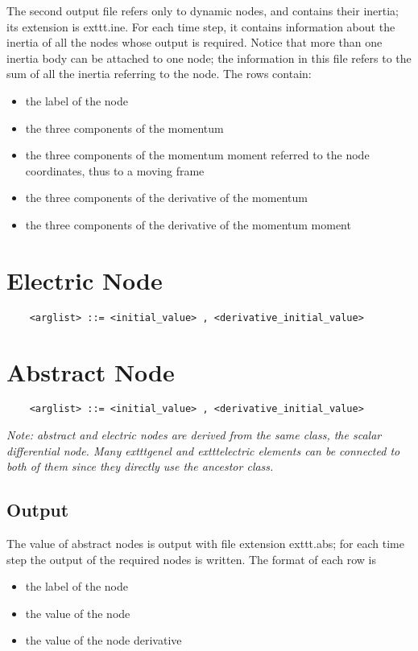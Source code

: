 \noindent
The second output file refers only to dynamic nodes, and contains their
inertia; its extension is 	exttt{.ine}.
For each time step, it contains information about the inertia of all the
nodes whose output is required.
Notice that more than one inertia body can be attached to one node; the
information in this file refers to the sum of all the inertia referring to
the node.
The rows contain:
\begin{itemize}
    \item the label of the node
    \item the three components of the momentum
    \item the three components of the momentum moment referred to the node
    coordinates, thus to a moving frame
    \item the three components of the derivative of the momentum
    \item the three components of the derivative of the momentum moment
\end{itemize}


\section{Electric Node}
\begin{verbatim}
    <arglist> ::= <initial_value> , <derivative_initial_value>
\end{verbatim}




\section{Abstract Node}
\begin{verbatim}
    <arglist> ::= <initial_value> , <derivative_initial_value>
\end{verbatim}
{\em
    Note: abstract and electric nodes are derived from the same class, the
    scalar differential node. Many 	exttt{genel} and 	exttt{electric} elements 
    can be connected to both of them since they directly use the ancestor
    class. 
}

\subsection{Output}
The value of abstract nodes is output with file extension 	exttt{.abs}; for
each time step the output of the required nodes is written.
The format of each row is
\begin{itemize}
    \item the label of the node
    \item the value of the node
    \item the value of the node derivative
\end{itemize}



